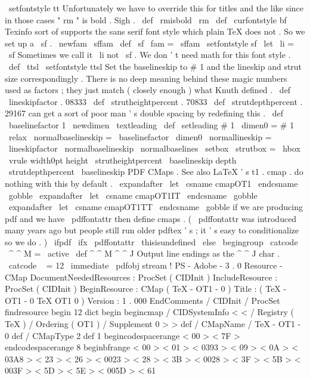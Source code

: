 {{{\
setfontstyle
{
tt
}
}
%
Unfortunately
we
have
to
override
this
for
titles
and
the
like
since
%
in
those
cases
"
rm
"
is
bold
.
Sigh
.
\
def
\
rmisbold
{
\
rm
\
def
\
curfontstyle
{
bf
}
}
%
Texinfo
sort
of
supports
the
sans
serif
font
style
which
plain
TeX
does
not
.
%
So
we
set
up
a
\
sf
.
\
newfam
\
sffam
\
def
\
sf
{
\
fam
=
\
sffam
\
setfontstyle
{
sf
}
}
\
let
\
li
=
\
sf
%
Sometimes
we
call
it
\
li
not
\
sf
.
%
We
don
'
t
need
math
for
this
font
style
.
\
def
\
ttsl
{
\
setfontstyle
{
ttsl
}
}
%
Set
the
baselineskip
to
#
1
and
the
lineskip
and
strut
size
%
correspondingly
.
There
is
no
deep
meaning
behind
these
magic
numbers
%
used
as
factors
;
they
just
match
(
closely
enough
)
what
Knuth
defined
.
%
\
def
\
lineskipfactor
{
.
08333
}
\
def
\
strutheightpercent
{
.
70833
}
\
def
\
strutdepthpercent
{
.
29167
}
%
%
can
get
a
sort
of
poor
man
'
s
double
spacing
by
redefining
this
.
\
def
\
baselinefactor
{
1
}
%
\
newdimen
\
textleading
\
def
\
setleading
#
1
{
%
\
dimen0
=
#
1
\
relax
\
normalbaselineskip
=
\
baselinefactor
\
dimen0
\
normallineskip
=
\
lineskipfactor
\
normalbaselineskip
\
normalbaselines
\
setbox
\
strutbox
=
\
hbox
{
%
\
vrule
width0pt
height
\
strutheightpercent
\
baselineskip
depth
\
strutdepthpercent
\
baselineskip
}
%
}
%
PDF
CMaps
.
See
also
LaTeX
'
s
t1
.
cmap
.
%
%
do
nothing
with
this
by
default
.
\
expandafter
\
let
\
csname
cmapOT1
\
endcsname
\
gobble
\
expandafter
\
let
\
csname
cmapOT1IT
\
endcsname
\
gobble
\
expandafter
\
let
\
csname
cmapOT1TT
\
endcsname
\
gobble
%
if
we
are
producing
pdf
and
we
have
\
pdffontattr
then
define
cmaps
.
%
(
\
pdffontattr
was
introduced
many
years
ago
but
people
still
run
%
older
pdftex
'
s
;
it
'
s
easy
to
conditionalize
so
we
do
.
)
\
ifpdf
\
ifx
\
pdffontattr
\
thisisundefined
\
else
\
begingroup
\
catcode
\
^
^
M
=
\
active
\
def
^
^
M
{
^
^
J
}
%
Output
line
endings
as
the
^
^
J
char
.
\
catcode
\
%
=
12
\
immediate
\
pdfobj
stream
{
%
!
PS
-
Adobe
-
3
.
0
Resource
-
CMap
%
%
DocumentNeededResources
:
ProcSet
(
CIDInit
)
%
%
IncludeResource
:
ProcSet
(
CIDInit
)
%
%
BeginResource
:
CMap
(
TeX
-
OT1
-
0
)
%
%
Title
:
(
TeX
-
OT1
-
0
TeX
OT1
0
)
%
%
Version
:
1
.
000
%
%
EndComments
/
CIDInit
/
ProcSet
findresource
begin
12
dict
begin
begincmap
/
CIDSystemInfo
<
<
/
Registry
(
TeX
)
/
Ordering
(
OT1
)
/
Supplement
0
>
>
def
/
CMapName
/
TeX
-
OT1
-
0
def
/
CMapType
2
def
1
begincodespacerange
<
00
>
<
7F
>
endcodespacerange
8
beginbfrange
<
00
>
<
01
>
<
0393
>
<
09
>
<
0A
>
<
03A8
>
<
23
>
<
26
>
<
0023
>
<
28
>
<
3B
>
<
0028
>
<
3F
>
<
5B
>
<
003F
>
<
5D
>
<
5E
>
<
005D
>
<
61
}}}
